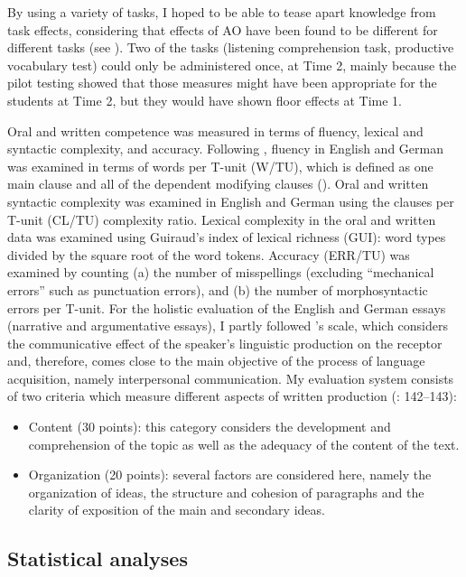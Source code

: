 \documentclass[output=paper,modfonts,nonflat,newtxmath]{langsci/langscibook}
\begin{document}
By using a variety of tasks, I hoped to be able to tease apart knowledge from task effects, considering that effects of AO have been found to be different for different tasks (see \citealt{Pfenninger2017}). Two of the tasks (listening comprehension task, productive vocabulary test) could only be administered once, at Time 2, mainly because the pilot testing showed that those measures might have been appropriate for the students at Time 2, but they would have shown floor effects at Time 1.


Oral and written competence was measured in terms of fluency, lexical and syntactic complexity, and accuracy. Following \citet{Wolfe-QuinteroEtAl1998}, fluency in English and German was examined in terms of words per T-unit (W/TU), which is defined as one main clause and all of the dependent modifying clauses (\citealt{EllisBarkhuizen2005}). Oral and written syntactic complexity was examined in English and German using the clauses per T-unit (CL/TU) complexity ratio. Lexical complexity in the oral and written data was examined using Guiraud’s index of lexical richness (GUI): word types divided by the square root of the word tokens. Accuracy (ERR/TU) was examined by counting (a) the number of misspellings (excluding ``mechanical errors'' such as punctuation errors), and (b) the number of morphosyntactic errors per T-unit. For the holistic evaluation of the English and German essays (narrative and argumentative essays), I partly followed \citealt{JacobsEtAl1981}'s scale, which considers the communicative effect of the speaker’s linguistic production on the receptor and, therefore, comes close to the main objective of the process of language acquisition, namely interpersonal communication. My evaluation system consists of two criteria which measure different aspects of written production (\citealt{LasagabasterEtAl2003}: 142--143):


\begin{itemize}
\item
Content (30 points): this category considers the development and comprehension of the topic as well as the adequacy of the content of the text.

\item
Organization (20 points): several factors are considered here, namely the organization of ideas, the structure and cohesion of paragraphs and the clarity of exposition of the main and secondary ideas.

\end{itemize}

\subsection{Statistical analyses}
\end{document}
